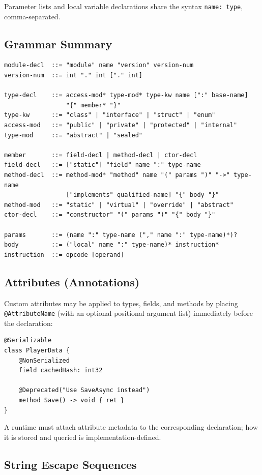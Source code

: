 \documentclass[11pt,a4paper]{article}
\newcommand{\code}[1]{\texttt{\small #1}}
\newcommand{\term}[1]{\texttt{#1}}
\begin{document}
Parameter lists and local variable declarations share the syntax
\code{name: type}, comma-separated.

\subsection{Grammar Summary}

\begin{lstlisting}[style=pseudo]
module-decl  ::= "module" name "version" version-num
version-num  ::= int "." int ["." int]

type-decl    ::= access-mod* type-mod* type-kw name [":" base-name]
                 "{" member* "}"
type-kw      ::= "class" | "interface" | "struct" | "enum"
access-mod   ::= "public" | "private" | "protected" | "internal"
type-mod     ::= "abstract" | "sealed"

member       ::= field-decl | method-decl | ctor-decl
field-decl   ::= ["static"] "field" name ":" type-name
method-decl  ::= method-mod* "method" name "(" params ")" "->" type-name
                 ["implements" qualified-name] "{" body "}"
method-mod   ::= "static" | "virtual" | "override" | "abstract"
ctor-decl    ::= "constructor" "(" params ")" "{" body "}"

params       ::= (name ":" type-name ("," name ":" type-name)*)?
body         ::= ("local" name ":" type-name)* instruction*
instruction  ::= opcode [operand]
\end{lstlisting}

\subsection{Attributes (Annotations)}

Custom attributes may be applied to types, fields, and methods by placing
\term{@AttributeName} (with an optional positional argument list) immediately
before the declaration:

\begin{lstlisting}[style=textir]
@Serializable
class PlayerData {
    @NonSerialized
    field cachedHash: int32

    @Deprecated("Use SaveAsync instead")
    method Save() -> void { ret }
}
\end{lstlisting}

A runtime must attach attribute metadata to the corresponding declaration;
how it is stored and queried is implementation-defined.

\subsection{String Escape Sequences}
\end{document}
